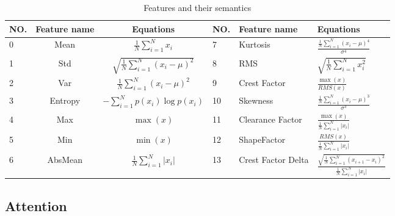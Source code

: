 \documentclass[lettersize,journal]{IEEEtran}
\begin{document}
\begin{table}
    \centering
\caption{Features and their semantics}

\captionsetup{justification=raggedright}
\tabcolsep=0.7cm
\label{tab:feature sets}
    \begin{tabular}{lcclll} \hline  
          NO.&Feature name& Equations &  NO.&Feature name&Equations \\ \hline  
          0&Mean& $\frac{1}{N}\sum_{i=1}^{N} x_i$ &  7&Kurtosis&$\frac{\frac{1}{N}\sum_{i=1}^{N} (x_i - \mu)^4}{\sigma^4}$ \\ 
          1
&Std& $\sqrt{\frac{1}{N}\sum_{i=1}^{N} (x_i - \mu)^2}$ &  8&RMS&$\sqrt{\frac{1}{N}\sum_{i=1}^{N} x_i^2}$ \\  
          2
&Var& $\frac{1}{N}\sum_{i=1}^{N} (x_i - \mu)^2$ &  9&Crest Factor&$\frac{\max (x)}{RMS(x)}$ 
\\
          3
&Entropy& $-\sum_{i=1}^{N} p(x_i) \log p(x_i)$ &  10&Skewness&$\frac{\frac{1}{N}\sum_{i=1}^{N} (x_i - \mu)^3}{\sigma^3}$ \\ 
          4
&Max& $\max(x)$ &  11&Clearance Factor&$ \frac{\max (x)}{\frac{1}{N}\sum_{i=1}^{N}|x_i|}$ \\ 
          5
&Min& $\min(x)$ &  12&ShapeFactor&$ \frac{RMS(x)}{\frac{1}{N}\sum_{i=1}^{N}|x_i|}$ 
\\
         6&AbsMean&$\frac{1}{N}\sum_{i=1}^{N} |x_i|$ &  13&Crest Factor Delta&$ \frac{\sqrt{\frac{1}{N}\sum_{i=1}^{N} (x_{i+1} - x_i)^2}}{\frac{1}{N}\sum_{i=1}^{N}|x_i|}$ \\ \hline
    \end{tabular}
\end{table}


\subsection{Attention }
\end{document}
